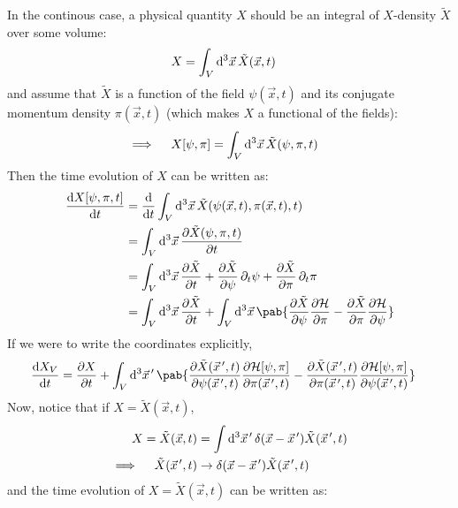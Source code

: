 In the continous case, a physical quantity $X$ should be an integral of $X$-density $\tilde{X}$ over some volume:
\begin{align}
  X & = \int_V \odif[3]{\vec{x}} \, \tilde{X}(\vec{x}, t)
\end{align}
and assume that $\tilde{X}$ is a function of the field $\psi(\vec{x}, t)$ and its conjugate momentum density $\pi(\vec{x}, t)$ (which makes $X$ a functional of the fields):
\begin{align}
  \implies \quad X[\psi, \pi] & = \int_V \odif[3]{\vec{x}} \, \tilde{X}(\psi, \pi, t)
\end{align}
Then the time evolution of $X$ can be written as:
\begin{align}
  \odv{X[\psi, \pi, t]}{t}
   & = \odv{}{t} \int_V \odif[3]{\vec{x}} \, \tilde{X}(\psi(\vec{x}, t), \pi(\vec{x}, t), t)                                    \\
   & = \int_V \odif[3]{\vec{x}} \, \pdv{\tilde{X}(\psi, \pi, t)}{t}                                                             \\
   & = \int_V \odif[3]{\vec{x}} \, \pdv{\tilde{X}}{t} + \pdv{\tilde{X}}{\psi} \pdif{t} \psi + \pdv{\tilde{X}}{\pi} \pdif{t} \pi \\
   & = \int_V \odif[3]{\vec{x}} \, \pdv{\tilde{X}}{t}
  + \int_V \odif[3]{\vec{x}} \, \pab{\pdv{\tilde{X}}{\psi} \pdv{\hami}{\pi} - \pdv{\tilde{X}}{\pi} \pdv{\hami}{\psi}}
\end{align}
If we were to write the coordinates explicitly,
\begin{align}
  \odv{X_V}{t} & = \pdv{X}{t} + \int_V \odif[3]{\vec{x}^{\,\prime}} \,\pab{\frac{\partial \tilde{X}(\vec{x}^{\,\prime}, t)}{\partial \psi(\vec{x}^{\,\prime}, t)} \frac{\partial \hami[\psi, \pi]}{\partial \pi(\vec{x}^{\,\prime}, t)} - \frac{\partial \tilde{X}(\vec{x}^{\,\prime}, t)}{\partial \pi(\vec{x}^{\,\prime}, t)} \frac{\partial \hami[\psi, \pi]}{\partial \psi(\vec{x}^{\,\prime}, t)}}
\end{align}
Now, notice that if $X = \tilde{X} (\vec{x}, t)$,
\begin{align}
  X = \tilde{X}(\vec{x}, t)                        & = \int \odif[3]{\vec{x}^{\,\prime}} \, \delta(\vec{x} - \vec{x}^{\,\prime}) \tilde{X}(\vec{x}^{\,\prime}, t) \\
  \implies \quad \tilde{X}(\vec{x}^{\, \prime}, t) & \to \delta(\vec{x} - \vec{x}^{\,\prime}) \tilde{X}(\vec{x}^{\,\prime}, t)
\end{align}
and the time evolution of $X = \tilde{X}(\vec{x}, t)$ can be written as:
